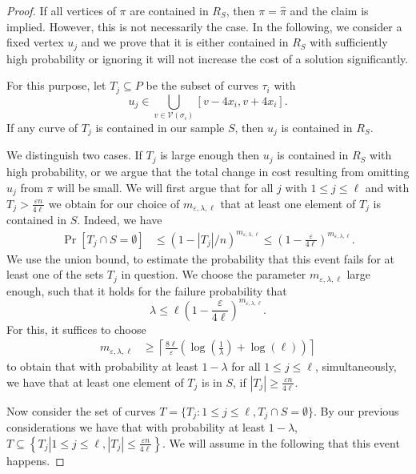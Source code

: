 \documentclass[11pt, letter]{article}
\providecommand{\eps}{{\varepsilon}}\newcommand{\Astop}{\overline{a}}
\providecommand{\ceil}[1]{\left\lceil {#1} \right\rceil}
\newcommand{\lenClusters}{\ensuremath{\ell}}
\newcommand{\trajectory}[2]{\ensuremath{{#1}_{#2}}}
\newcommand{\inputSym}{\ensuremath{\tau}}
\newcommand{\inputTraj}[1]{\trajectory{\inputSym}{#1}}
\newcommand{\VtxSet}{\ensuremath{\mathcal{V}}}
\begin{document}
\begin{proof}
If all vertices of $\pi$ are contained in $R_S$, then $\pi=\widehat{\pi}$ and the claim is implied.
However, this is not necessarily the case. In the following, we consider a fixed vertex $u_j$ 
and we prove that it is either contained in $R_S$ with sufficiently high probability or
ignoring it will not increase the cost of a solution significantly. 

For this purpose, let $T_j \subseteq P$ be the subset of curves $\inputTraj{i}$ with 
\[u_j \in \bigcup_{v\in \VtxSet(\sigma_i) } [v-4x_i,v+ 4x_i].\] 
If any curve of $T_j$ is contained in our sample $S$, then $u_j$ is
contained in $R_S$.

We distinguish two cases.  If $T_j$ is large enough then $u_j$ is
contained in $R_S$ with high probability, or we argue that the total change in cost resulting 
from omitting $u_j$ from $\pi$ will be small.  
We will first argue that for all $j$ with $1\le j \le \ell$ and with $T_j > \frac{\eps n}{4\ell}$ we obtain for our choice of $m_{\eps,\lambda,\lenClusters}$ that at least one element of $T_j$ is contained in $S$. Indeed, we have
\begin{align}
\Pr[ T_j \cap S = \emptyset] &\leq (1-|T_j|/n)^{m_{\eps,\lambda,\lenClusters}} \leq \left( 1 - \frac{\eps}{4 \lenClusters} \right) ^{m_{\eps,\lambda,\lenClusters}}.
\end{align}
We use the union bound, to estimate the probability that this event fails for at least one of the 
sets $T_j$ in question. We choose the parameter $m_{\eps,\lambda,\lenClusters}$ large
enough, such that it holds for the failure probability that
\[\lambda \leq \lenClusters \left( 1 - \frac{\eps}{4 \lenClusters} \right)
^{m_{\eps,\lambda,\lenClusters}}.\]
For this, it suffices to choose 
\begin{align*}
m_{\eps,\lambda,\lenClusters} &\ge
\ceil{\frac{8\lenClusters}{\eps}
\left(\log\left(\frac{1}{\lambda}\right)+\log(\lenClusters)\right)}
\end{align*}
to obtain that with probability at least $1-\lambda$ for all $1\le j \le \ell$, simultaneously,
we have that at least one element of $T_j$ is in $S$, if $|T_j| \ge \frac{\eps n}{4 \ell}$.

Now consider the set of curves $T = \{ T_j : 1\le j \le \ell, T_j \cap S = \emptyset\}$.
By our previous considerations we have that with probability at least $1-\lambda$,
$T \subseteq \left\{T_j \left| 1\leq j \leq\lenClusters, |T_j|
\leq \frac{\eps n}{4 \lenClusters} \right. \right\}$. We will assume in the following
that this event happens.


\end{proof}
\end{document}
